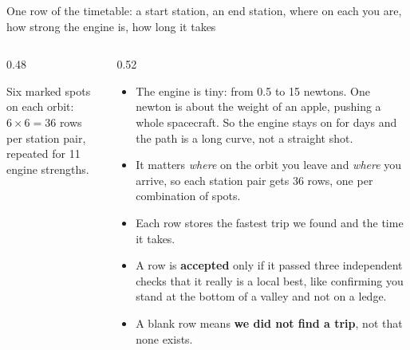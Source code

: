 \documentclass[aspectratio=169,10pt]{beamer}
\begin{document}
\begin{frame}{One row of the timetable: a start station, an end station, where on each you are, how strong the engine is, how long it takes}
  \begin{columns}[T]
    \begin{column}{0.48\textwidth}
      \centering

      \vspace{4pt}
      {\footnotesize Six marked spots on each orbit: $6\times6 = 36$ rows per station pair,\\[-1pt] repeated for 11 engine strengths.}
    \end{column}
    \begin{column}{0.52\textwidth}
      \small
      \begin{itemize}
        \setlength\itemsep{5pt}
        \item The engine is tiny: from 0.5 to 15 newtons. One newton is about the weight of an apple, pushing a whole spacecraft. So the engine stays on for days and the path is a long curve, not a straight shot.
        \item It matters \emph{where} on the orbit you leave and \emph{where} you arrive, so each station pair gets 36 rows, one per combination of spots.
        \item Each row stores the fastest trip we found and the time it takes.
        \item A row is \textbf{accepted} only if it passed three independent checks that it really is a local best, like confirming you stand at the bottom of a valley and not on a ledge.
        \item A blank row means \textbf{we did not find a trip}, not that none exists.
      \end{itemize}
    \end{column}
  \end{columns}
\end{frame}
\end{document}
